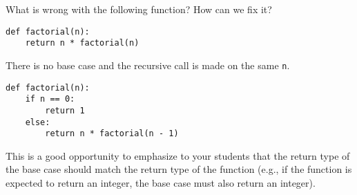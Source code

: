 \pagebreak
\begin{blocksection}
\question What is wrong with the following function? How can we fix it?

\begin{lstlisting}
def factorial(n):
    return n * factorial(n)
\end{lstlisting}

\begin{solution}[1in]
There is no base case and the recursive call is made on the same \lstinline{n}.

\begin{lstlisting}
def factorial(n):
    if n == 0:
        return 1
    else:
        return n * factorial(n - 1)
\end{lstlisting}
\end{solution}

\begin{questionmeta}
    This is a good opportunity to emphasize to your students that the return type of the base case should match the return type of the function (e.g., if the function is expected to return an integer, the base case must also return an integer).
\end{questionmeta}
\end{blocksection}
